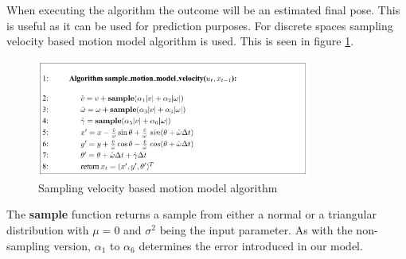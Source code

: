 When executing the algorithm the outcome will be an estimated final pose. This is useful as it can be used for prediction purposes. For discrete spaces sampling velocity based motion model algorithm is used. This is seen in figure \ref{fig:samplemodelalgo}.
\begin{figure}[H]
\centering
\includegraphics[width=0.8\textwidth]{billeder/samplemodelalgo}
\caption{Sampling velocity based motion model algorithm}
\label{fig:samplemodelalgo}
\end{figure}
The \textbf{sample} function returns a sample from either a normal or a triangular distribution with $\mu = 0$ and $\sigma^2$ being the input parameter. As with the non-sampling version, $\alpha_1$ to $\alpha_6$ determines the error introduced in our model.

